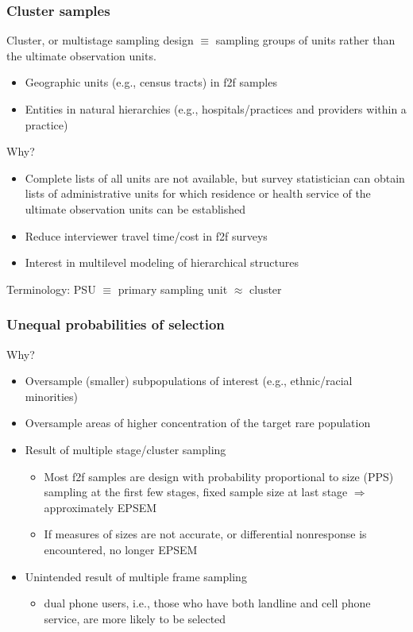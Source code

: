 \documentclass{beamer}
\begin{document}
\begin{frame}\frametitle{Cluster samples}

Cluster, or multistage sampling design $\equiv$ sampling groups of units rather than the ultimate observation units.
\begin{itemize}
    \item Geographic units (e.g., census tracts) in f2f samples
    \item Entities in natural hierarchies (e.g., hospitals/practices and providers within a practice)
\end{itemize}

Why?

\begin{itemize}
    \item Complete lists of all units are not available, but survey statistician
        can obtain lists of administrative units
        for which residence or health service of the ultimate observation units
        can be established
    \item Reduce interviewer travel time/cost in f2f surveys
    \item Interest in multilevel modeling of hierarchical structures
\end{itemize}

Terminology: PSU $\equiv$ primary sampling unit $\approx$ cluster

\end{frame}

\begin{frame}\frametitle{Unequal probabilities of selection}

Why?

\begin{itemize}
    \item Oversample (smaller) subpopulations of interest (e.g., ethnic/racial minorities)
    \item Oversample areas of higher concentration of the target rare population
    \item Result of multiple stage/cluster sampling
    \begin{itemize}
        \item Most f2f samples are design with probability proportional to size (PPS) sampling at the first few stages,
            fixed sample size at last stage $\Rightarrow$ approximately EPSEM
        \item If measures of sizes are not accurate, or differential nonresponse is encountered, no longer EPSEM
    \end{itemize}
    \item Unintended result of multiple frame sampling
        \begin{itemize}
            \item dual phone users, i.e., those who have both landline and cell phone service, are more likely to be selected
        \end{itemize}
\end{itemize}

\end{frame}
\end{document}
